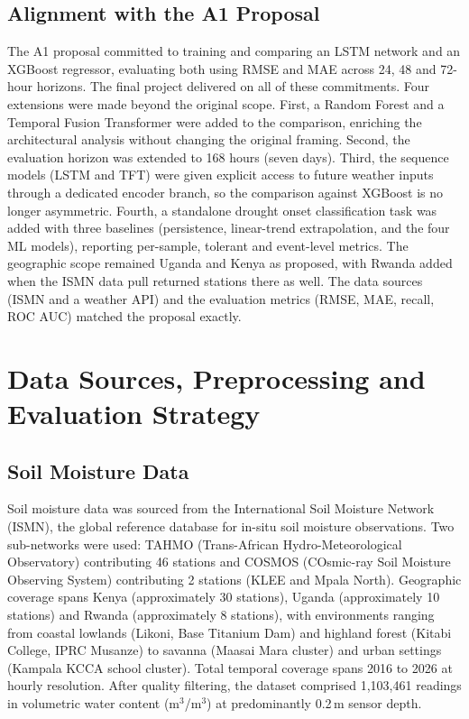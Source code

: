 \documentclass[12pt, a4paper]{article}
\begin{document}
\subsection{Alignment with the A1 Proposal}

The A1 proposal committed to training and comparing an LSTM network and an
XGBoost regressor, evaluating both using RMSE and MAE across 24, 48 and 72-hour
horizons. The final project delivered on all of these commitments. Four extensions
were made beyond the original scope. First, a Random Forest and a Temporal Fusion
Transformer were added to the comparison, enriching the architectural analysis
without changing the original framing. Second, the evaluation horizon was extended
to 168 hours (seven days). Third, the sequence models (LSTM and TFT) were given
explicit access to future weather inputs through a dedicated encoder branch, so
the comparison against XGBoost is no longer asymmetric. Fourth, a standalone
drought onset classification task was added with three baselines (persistence,
linear-trend extrapolation, and the four ML models), reporting per-sample,
tolerant and event-level metrics. The geographic scope remained Uganda and Kenya
as proposed, with Rwanda added when the ISMN data pull returned stations there
as well. The data sources (ISMN and a weather API) and the evaluation metrics
(RMSE, MAE, recall, ROC AUC) matched the proposal exactly.

\section{Data Sources, Preprocessing and Evaluation Strategy}

\subsection{Soil Moisture Data}

Soil moisture data was sourced from the International Soil Moisture Network
(ISMN), the global reference database for in-situ soil moisture observations.
Two sub-networks were used: TAHMO (Trans-African Hydro-Meteorological Observatory)
contributing 46 stations and COSMOS (COsmic-ray Soil Moisture Observing System)
contributing 2 stations (KLEE and Mpala North). Geographic coverage spans Kenya
(approximately 30 stations), Uganda (approximately 10 stations) and Rwanda
(approximately 8 stations), with environments ranging from coastal lowlands
(Likoni, Base Titanium Dam) and highland forest (Kitabi College, IPRC Musanze)
to savanna (Maasai Mara cluster) and urban settings (Kampala KCCA school cluster).
Total temporal coverage spans 2016 to 2026 at hourly resolution. After quality
filtering, the dataset comprised 1{,}103{,}461 readings in volumetric water
content (m$^3$/m$^3$) at predominantly 0.2\,m sensor depth.
\end{document}
